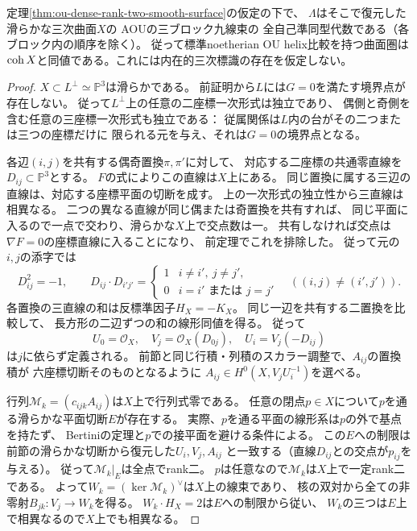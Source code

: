 \begin{theorem}[rank二の可換三次曲面としての認識]
\label{thm:ou-dense-rank-two-commutative}
定理\ref{thm:ou-dense-rank-two-smooth-surface}の仮定の下で、
$\Lambda$はそこで復元した滑らかな三次曲面$X$の
AOU\cite[(4.1), (4.2)]{AOU2024}の三ブロック九線束の
全自己準同型代数である（各ブロック内の順序を除く）。
従って標準noetherian OU helix比較を持つ曲面圏は
$\operatorname{coh} X$と同値である。これには内在的三次標識の存在を仮定しない。
\end{theorem}
\begin{proof}
$X\subset L^\perp\simeq\mathbb P^3$は滑らかである。
前証明から$L$には$G=0$を満たす境界点が存在しない。
従って$L^\perp$上の任意の二座標一次形式は独立であり、
偶側と奇側を含む任意の三座標一次形式も独立である：
従属関係は$L$内の台がその二つまたは三つの座標だけに
限られる元を与え、それは$G=0$の境界点となる。

各辺$(i,j)$を共有する偶奇置換$\pi,\pi'$に対して、
対応する二座標の共通零直線を$D_{ij}\subset\mathbb P^3$とする。
$F$の式によりこの直線は$X$上にある。
同じ置換に属する三辺の直線は、対応する座標平面の切断を成す。
上の一次形式の独立性から三直線は相異なる。
二つの異なる直線が同じ偶または奇置換を共有すれば、
同じ平面に入るので一点で交わり、滑らかな$X$上で交点数は一。
共有しなければ交点は$\nabla F=0$の座標直線に入ることになり、
前定理でこれを排除した。
従って元の$i,j$の添字では
\[
 D_{ij}^2=-1,\qquad
 D_{ij}\cdot D_{i'j'}=
 \begin{cases}1&i\ne i',\ j\ne j',\\0&i=i'\text{ または }j=j'\end{cases}
 \quad((i,j)\ne(i',j')).
\]
各置換の三直線の和は反標準因子$H_X=-K_X$。
同じ一辺を共有する二置換を比較して、
長方形の二辺ずつの和の線形同値を得る。
従って
\[
 U_0=\mathcal O_X,\quad V_j=\mathcal O_X(D_{0j}),\quad
 U_i=V_j(-D_{ij})
\]
は$j$に依らず定義される。
前節と同じ行積・列積のスカラー調整で、$A_{ij}$の置換積が
六座標切断そのものとなるように
$A_{ij}\in H^0(X,V_jU_i^{-1})$を選べる。

行列$\mathscr M_k=(c_{ijk}A_{ij})$は$X$上で行列式零である。
任意の閉点$p\in X$について$p$を通る滑らかな平面切断$E$が存在する。
実際、$p$を通る平面の線形系は$p$の外で基点を持たず、
Bertiniの定理と$p$での接平面を避ける条件による。
この$E$への制限は前節の滑らかな切断から復元した$U_i,V_j,A_{ij}$
と一致する（直線$D_{ij}$との交点が$p_{ij}$を与える）。
従って$\mathscr M_k|_E$は全点でrank二。
$p$は任意なので$\mathscr M_k$は$X$上で一定rank二である。
よって$W_k=(\ker\mathscr M_k)^\vee$は$X$上の線束であり、
核の双対から全ての非零射$B_{jk}:V_j\to W_k$を得る。
$W_k\cdot H_X=2$は$E$への制限から従い、
$W_k$の三つは$E$上で相異なるので$X$上でも相異なる。


\end{proof}

